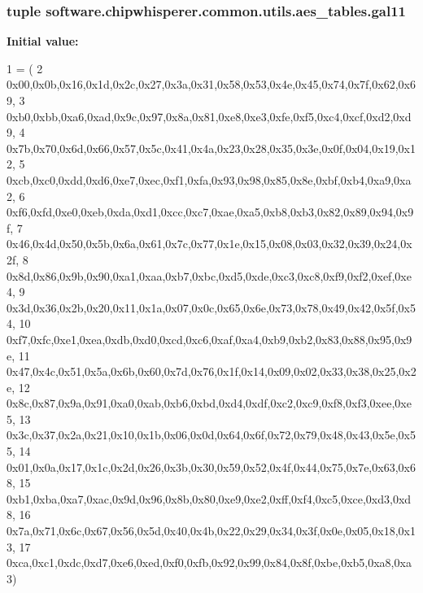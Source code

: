 \subsubsection[{gal11}]{\setlength{\rightskip}{0pt plus 5cm}tuple software.\+chipwhisperer.\+common.\+utils.\+aes\+\_\+tables.\+gal11}\label{namespacesoftware_1_1chipwhisperer_1_1common_1_1utils_1_1aes__tables_af10137d96fddc559ceabb73ee844ecb3}
{\bfseries Initial value\+:}
\begin{DoxyCode}
1 = (
2 0x00,0x0b,0x16,0x1d,0x2c,0x27,0x3a,0x31,0x58,0x53,0x4e,0x45,0x74,0x7f,0x62,0x69,
3 0xb0,0xbb,0xa6,0xad,0x9c,0x97,0x8a,0x81,0xe8,0xe3,0xfe,0xf5,0xc4,0xcf,0xd2,0xd9,
4 0x7b,0x70,0x6d,0x66,0x57,0x5c,0x41,0x4a,0x23,0x28,0x35,0x3e,0x0f,0x04,0x19,0x12,
5 0xcb,0xc0,0xdd,0xd6,0xe7,0xec,0xf1,0xfa,0x93,0x98,0x85,0x8e,0xbf,0xb4,0xa9,0xa2,
6 0xf6,0xfd,0xe0,0xeb,0xda,0xd1,0xcc,0xc7,0xae,0xa5,0xb8,0xb3,0x82,0x89,0x94,0x9f,
7 0x46,0x4d,0x50,0x5b,0x6a,0x61,0x7c,0x77,0x1e,0x15,0x08,0x03,0x32,0x39,0x24,0x2f,
8 0x8d,0x86,0x9b,0x90,0xa1,0xaa,0xb7,0xbc,0xd5,0xde,0xc3,0xc8,0xf9,0xf2,0xef,0xe4,
9 0x3d,0x36,0x2b,0x20,0x11,0x1a,0x07,0x0c,0x65,0x6e,0x73,0x78,0x49,0x42,0x5f,0x54,
10 0xf7,0xfc,0xe1,0xea,0xdb,0xd0,0xcd,0xc6,0xaf,0xa4,0xb9,0xb2,0x83,0x88,0x95,0x9e,
11 0x47,0x4c,0x51,0x5a,0x6b,0x60,0x7d,0x76,0x1f,0x14,0x09,0x02,0x33,0x38,0x25,0x2e,
12 0x8c,0x87,0x9a,0x91,0xa0,0xab,0xb6,0xbd,0xd4,0xdf,0xc2,0xc9,0xf8,0xf3,0xee,0xe5,
13 0x3c,0x37,0x2a,0x21,0x10,0x1b,0x06,0x0d,0x64,0x6f,0x72,0x79,0x48,0x43,0x5e,0x55,
14 0x01,0x0a,0x17,0x1c,0x2d,0x26,0x3b,0x30,0x59,0x52,0x4f,0x44,0x75,0x7e,0x63,0x68,
15 0xb1,0xba,0xa7,0xac,0x9d,0x96,0x8b,0x80,0xe9,0xe2,0xff,0xf4,0xc5,0xce,0xd3,0xd8,
16 0x7a,0x71,0x6c,0x67,0x56,0x5d,0x40,0x4b,0x22,0x29,0x34,0x3f,0x0e,0x05,0x18,0x13,
17 0xca,0xc1,0xdc,0xd7,0xe6,0xed,0xf0,0xfb,0x92,0x99,0x84,0x8f,0xbe,0xb5,0xa8,0xa3)
\end{DoxyCode}
\hypertarget{namespacesoftware_1_1chipwhisperer_1_1common_1_1utils_1_1aes__tables_a889f148d039807d1f829cd3c63058d94}{}
